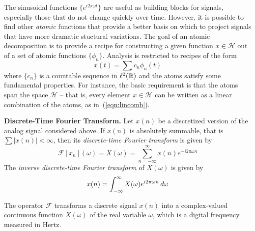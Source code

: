 The sinusoidal functions $\{e^{i2\pi\omega t}\}$ are useful as building
blocks for signals, especially those that do not change quickly over time.
However, it is possible to find other \emph{atomic} functions that
provide a better 
basis on which to project signals that have more
dramatic stuctural variations.  
The goal of an atomic decomposition is to provide a recipe for
constructing a given function $x\in \mathcal{H}$ out of a set of atomic
functions $\{\phi_n\}$.  Analysis is restricted to recipes of the form
\begin{equation}
\label{eqn:lincomb}
x(t) = \sum c_n \phi_n(t) 
\end{equation}
where $\{c_n\}$ is a countable sequence in $\ell^2(\mathbb{R})$ and the atoms
satisfy some fundamental properties.  For instance, the basic
requirement is that the atoms span the space $\mathcal{H}$ -- that is,
every element $x \in \mathcal{H}$ can be written as a linear
combination of the atoms, as in~(\ref{eqn:lincomb}).

\begin{define}{\bf Discrete-Time Fourier Transform. } Let $x(n)$ be a
discretized version of the analog signal considered above.  If $x(n)$
is absolutely summable, that is $\sum|x(n)| < \infty$, then its
\emph{discrete-time Fourier transform} is given by 
\begin{equation}
\label{eqn:DTFT}
\mathcal{F}[x_n](\omega) = X(\omega) = \sum_{n=-\infty}^{\infty}x(n) e^{-i2\pi\omega n}
\end{equation}
The \emph{inverse discrete-time Fourier transform} of $X(\omega)$ is
given by 
\begin{equation}
\label{eqn:InvDTFT}
x(n) = %
\integral X(\omega) e^{i2\pi\omega n} \,d\omega
\end{equation}
\end{define}
The operator $\mathcal{F}$ transforms a discrete signal $x(n)$ into a
complex-valued continuous function $X(\omega)$ of the real
variable $\omega$, which is a digital frequency measured in Hertz.

